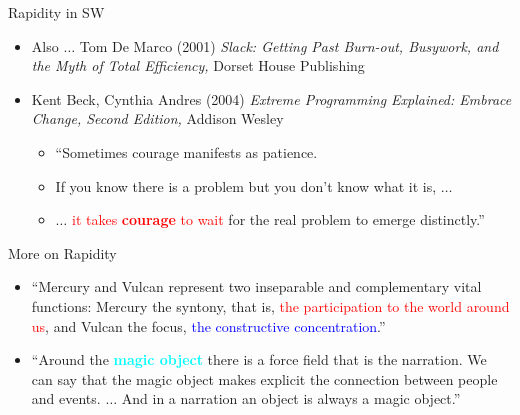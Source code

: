 \documentclass{beamer}
\begin{document}
\begin{frame}
{\centerline{Rapidity in SW}}

\begin{itemize}
 \item Also $\ldots{}$ Tom De Marco (2001) \textit{Slack: Getting Past Burn-out, Busywork, and the Myth of Total Efficiency,} Dorset House Publishing\vspace{0.3cm}
\item Kent Beck, Cynthia Andres (2004) \textit{Extreme Programming Explained: Embrace Change, Second Edition,} Addison Wesley \\
\begin{itemize}
\item ``Sometimes courage manifests as patience.
\item If you know there is a problem but you don’t know what it is, $\ldots{}$
\item $\ldots{}$ \textcolor{red}{it takes \textbf{courage} to wait} for the real problem to emerge distinctly.''
\end{itemize}
\end{itemize}

\end{frame}

\begin{frame}
{\centerline{More on Rapidity}}

\begin{itemize}
\item ``Mercury and Vulcan represent two inseparable and complementary vital functions: Mercury the syntony, that is, \textcolor{red}{the participation to the world around us}, and Vulcan the focus, \textcolor{blue}{the constructive concentration}.'' \vspace{0.2cm}
\item ``Around the \textcolor{cyan}{\textbf{magic object}} there is a force field that is the narration. We can say that the magic object makes explicit the connection between people and events. $\ldots{}$ And in a narration an object is always a magic object.''

\end{itemize}

\end{frame}
\end{document}
